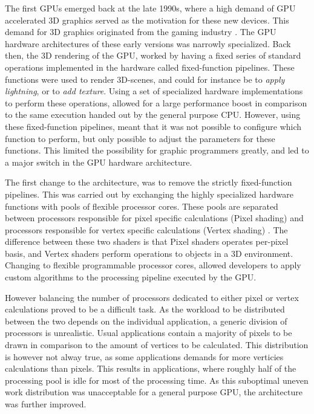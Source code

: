 The first GPUs  emerged back at the late 1990s, where a high demand of GPU accelerated 3D graphics served as the motivation for these new devices.
This demand for 3D graphics originated from the gaming industry \cite{Johansson2010}.
The GPU hardware architectures of these early versions was narrowly specialized.
Back then, the 3D rendering of the GPU, worked by having a fixed series of standard operations implemented in the hardware called fixed-function pipelines.
These functions were used to render 3D-scenes, and could for instance be to \textit{apply lightning}, or to \textit{add texture}.
Using a set of specialized hardware implementations to perform these operations, allowed for a large performance boost in comparison to the same execution handed out by the general purpose CPU.
However, using these fixed-function pipelines, meant that it was not possible to configure which function to perform, but only possible to adjust the parameters for these functions.
This limited the possibility for graphic programmers greatly, and led to a major switch in the GPU hardware architecture.

The first change to the architecture, was to remove the strictly fixed-function pipelines.
This was carried out by exchanging the highly specialized hardware functions with pools of flexible processor cores.
These pools are separated between processors responsible for pixel specific calculations (Pixel shading) and processors responsible for vertex specific calculations (Vertex shading) \cite{Johansson2010}.
The difference between these two shaders is that Pixel shaders operates per-pixel basis, and Vertex shaders perform operations to objects in a 3D environment.
Changing to flexible programmable processor cores, allowed developers to apply custom algorithms to the processing pipeline executed by the GPU.

However balancing the number of processors dedicated to either pixel or vertex calculations proved to be a difficult task.
As the workload to be distributed between the two depends on the individual application, a generic division of processors is unrealistic.
Usual applications contain a majority of pixels to be drawn in comparison to the amount of vertices to be calculated.
This distribution is however not alway true, as some applications demands for more verticies calculations than pixels.
This results in applications, where roughly half of the processing pool is idle for most of the processing time.
As this suboptimal uneven work distribution was unacceptable for a general purpose GPU, the architecture was further improved.

